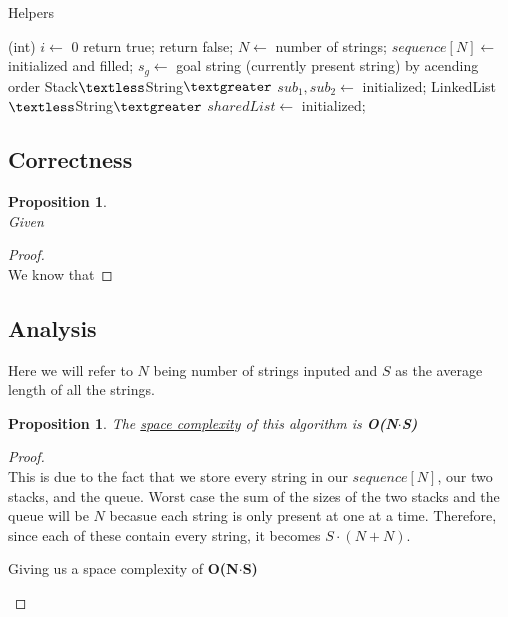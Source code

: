 \documentclass[12pt]{article}
\newtheorem{proposition}[theorem]{Proposition}
\begin{document}
\begin{algorithm}[H]
\caption{Helpers}
\begin{algorithmic}
        \State (int) $i \gets$ 0
                    return true;
                \EndIf
            \EndIf
        \EndFor
        \State return false;
    \EndProcedure
        \State $N \gets$ number of strings; $sequence[N] \gets$ initialized and filled;
        \State $s_g \gets$ goal string (currently present string)
        \State {} by acending order
        \State Stack$\textless$String$\textgreater$ $sub_1, sub_2 \gets$ initialized;
        \State LinkedList$\textless$String$\textgreater$ $sharedList \gets$ initialized;
    \EndProcedure
\end{algorithmic}
\end{algorithm}


\subsection{Correctness}
\begin{proposition}
~ \\ \indent Given
\end{proposition}

\begin{proof}
~ \\ \indent We know that
\end{proof}

\subsection{Analysis}
Here we will refer to $N$ being number of strings inputed and $S$ as the average length of all the strings.
\begin{proposition}
\label{numq}
The \underline{space complexity} of this algorithm is \textbf{O(N$\cdot$S)}
\end{proposition}

\begin{proof}
~ \\ \indent This is due to the fact that we store every string in our $sequence[N]$, our two stacks,
and the queue. Worst case the sum of the sizes of the two stacks and the queue will be $N$ becasue each string
is only present at one at a time. Therefore, since each of these contain every string, it becomes $S\cdot (N + N)$.
\begin{center}
    Giving us a space complexity of \textbf{O(N$\cdot$S)}
\end{center}
\end{proof}
\end{document}
